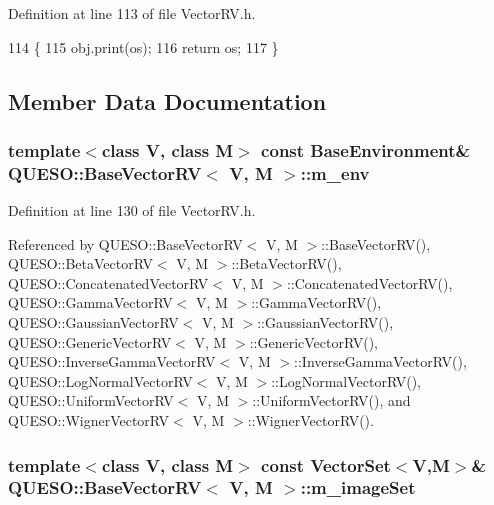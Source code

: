 Definition at line 113 of file Vector\-R\-V.\-h.


\begin{DoxyCode}
114                                     \{
115     obj.print(os);
116     \textcolor{keywordflow}{return} os;
117   \}
\end{DoxyCode}


\subsection{Member Data Documentation}
\hypertarget{class_q_u_e_s_o_1_1_base_vector_r_v_a556761c50e2d171977ef5f19a63c8c73}{
\subsubsection[{m\-\_\-env}]{\setlength{\rightskip}{0pt plus 5cm}template$<$class V, class M$>$ const {\bf Base\-Environment}\& {\bf Q\-U\-E\-S\-O\-::\-Base\-Vector\-R\-V}$<$ V, M $>$\-::m\-\_\-env\hspace{0.3cm}{\ttfamily [protected]}}}\label{class_q_u_e_s_o_1_1_base_vector_r_v_a556761c50e2d171977ef5f19a63c8c73}


Definition at line 130 of file Vector\-R\-V.\-h.



Referenced by Q\-U\-E\-S\-O\-::\-Base\-Vector\-R\-V$<$ V, M $>$\-::\-Base\-Vector\-R\-V(), Q\-U\-E\-S\-O\-::\-Beta\-Vector\-R\-V$<$ V, M $>$\-::\-Beta\-Vector\-R\-V(), Q\-U\-E\-S\-O\-::\-Concatenated\-Vector\-R\-V$<$ V, M $>$\-::\-Concatenated\-Vector\-R\-V(), Q\-U\-E\-S\-O\-::\-Gamma\-Vector\-R\-V$<$ V, M $>$\-::\-Gamma\-Vector\-R\-V(), Q\-U\-E\-S\-O\-::\-Gaussian\-Vector\-R\-V$<$ V, M $>$\-::\-Gaussian\-Vector\-R\-V(), Q\-U\-E\-S\-O\-::\-Generic\-Vector\-R\-V$<$ V, M $>$\-::\-Generic\-Vector\-R\-V(), Q\-U\-E\-S\-O\-::\-Inverse\-Gamma\-Vector\-R\-V$<$ V, M $>$\-::\-Inverse\-Gamma\-Vector\-R\-V(), Q\-U\-E\-S\-O\-::\-Log\-Normal\-Vector\-R\-V$<$ V, M $>$\-::\-Log\-Normal\-Vector\-R\-V(), Q\-U\-E\-S\-O\-::\-Uniform\-Vector\-R\-V$<$ V, M $>$\-::\-Uniform\-Vector\-R\-V(), and Q\-U\-E\-S\-O\-::\-Wigner\-Vector\-R\-V$<$ V, M $>$\-::\-Wigner\-Vector\-R\-V().

\hypertarget{class_q_u_e_s_o_1_1_base_vector_r_v_ad31872bb4da22d47528cb9d691b3b7ff}{
\subsubsection[{m\-\_\-image\-Set}]{\setlength{\rightskip}{0pt plus 5cm}template$<$class V, class M$>$ const {\bf Vector\-Set}$<$V,M$>$\& {\bf Q\-U\-E\-S\-O\-::\-Base\-Vector\-R\-V}$<$ V, M $>$\-::m\-\_\-image\-Set\hspace{0.3cm}{\ttfamily [protected]}}}\label{class_q_u_e_s_o_1_1_base_vector_r_v_ad31872bb4da22d47528cb9d691b3b7ff}


